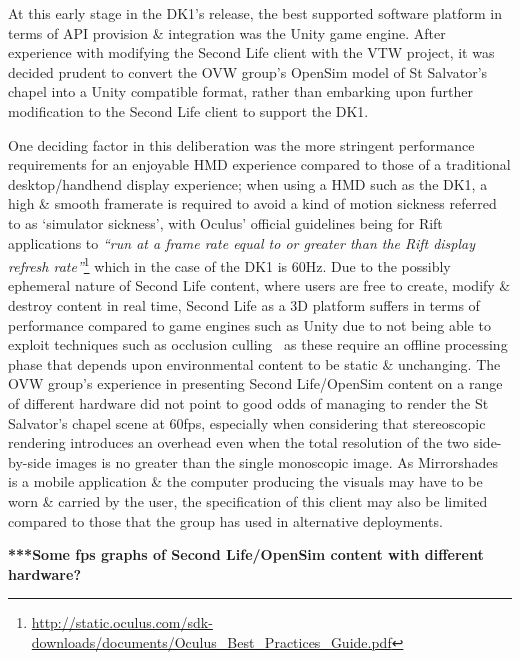 At this early stage in the DK1's release, the best supported software platform in terms of API provision \& integration was the Unity game engine. After experience with modifying the Second Life client with the VTW project, it was decided prudent to convert the OVW group's OpenSim model of St Salvator's chapel into a Unity compatible format, rather than embarking upon further modification to the Second Life client to support the DK1.

One deciding factor in this deliberation was the more stringent performance requirements for an enjoyable HMD experience compared to those of a traditional desktop/handhend display experience; when using a HMD such as the DK1, a high \& smooth framerate is required to avoid a kind of motion sickness referred to as `simulator sickness', with Oculus' official guidelines being for Rift applications to \textit{``run at a frame rate equal to or greater than the Rift display refresh rate''}\footnote{\url{http://static.oculus.com/sdk-downloads/documents/Oculus_Best_Practices_Guide.pdf}} which in the case of the DK1 is 60Hz. Due to the possibly ephemeral nature of Second Life content, where users are free to create, modify \& destroy content in real time, Second Life as a 3D platform suffers in terms of performance compared to game engines such as Unity due to not being able to exploit techniques such as occlusion culling~\cite{willmott:largecomplex} as these require an offline processing phase that depends upon environmental content to be static \& unchanging. The OVW group's experience in presenting Second Life/OpenSim content on a range of different hardware did not point to good odds of managing to render the St Salvator's chapel scene at 60fps, especially when considering that stereoscopic rendering introduces an overhead even when the total resolution of the two side-by-side images is no greater than the single monoscopic image. As Mirrorshades is a mobile application \& the computer producing the visuals may have to be worn \& carried by the user, the specification of this client may also be limited compared to those that the group has used in alternative deployments.

\textbf{***Some fps graphs of Second Life/OpenSim content with different hardware?}


